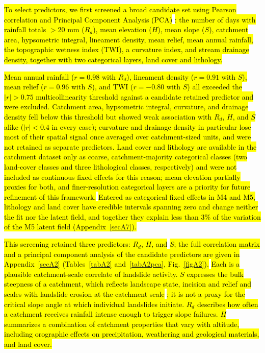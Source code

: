 \documentclass[journal abbreviation, manuscript]{copernicus}
\newcommand{\hlE}[1]{{\sethlcolor{edcyan}\hl{#1}}}
\begin{document}
\hl{To select predictors, we first screened a broad candidate set using Pearson correlation and Principal Component Analysis (PCA) }\citep{reichenbach2018review}\hl{: the number of days with rainfall totals $>$20 mm ($R_d$), mean elevation ($H$), mean slope ($S$), catchment area, hypsometric integral, lineament density, mean relief, mean annual rainfall, the topographic wetness index (TWI), a curvature index, and stream drainage density, together with two categorical layers, land cover and lithology.}

\hl{Mean annual rainfall ($r = 0.98$ with $R_d$), lineament density ($r = 0.91$ with $S$), mean relief ($r = 0.96$ with $S$), and TWI ($r = -0.80$ with $S$) all exceeded the $|r| > 0.75$ multicollinearity threshold against a candidate retained predictor and were excluded. 
Catchment area, hypsometric integral, curvature, and drainage density fell below this threshold but showed weak association with $R_d$, $H$, and $S$ alike ($|r| < 0.4$ in every case); curvature and drainage density in particular lose most of their spatial signal once averaged over catchment-sized units, and were not retained as separate predictors. 
Land cover and lithology are available in the catchment dataset only as coarse, catchment-majority categorical classes (two land-cover classes and three lithological classes, respectively) and were not included as continuous fixed effects for this reason; mean elevation partially proxies for both, and finer-resolution categorical layers are a priority for future refinement of this framework.} \hlE{Entered as categorical fixed effects in M4 and M5, lithology and land cover have credible intervals spanning zero and change neither the fit nor the latent field, and together they explain less than 3\% of the variation of the M5 latent field (\mbox{Appendix~\ref{secA7}}).}

\hl{This screening retained three predictors: $R_d$, $H$, and} \hlE{$S$; the full correlation matrix and a principal component analysis of the candidate predictors are given in \mbox{Appendix~\ref{secA2}} (\mbox{Tables~\ref{tabA2}} and~\mbox{\ref{tabA2pca}}, \mbox{Fig.~\ref{figA2}}).} 
\hlE{Each is a plausible catchment-scale correlate of landslide activity. $S$ expresses the bulk steepness of a catchment, which reflects landscape state, incision and relief and scales with landslide erosion at the catchment scale }\citep{Montgomery2002, Larsen2012}\hlE{; it is not a proxy for the critical slope angle at which individual landslides initiate. $R_d$ describes how often a catchment receives rainfall intense enough to trigger slope failures. $H$ summarizes a combination of catchment properties that vary with altitude, including orographic effects on precipitation, weathering and geological materials, and land cover.}
\end{document}

